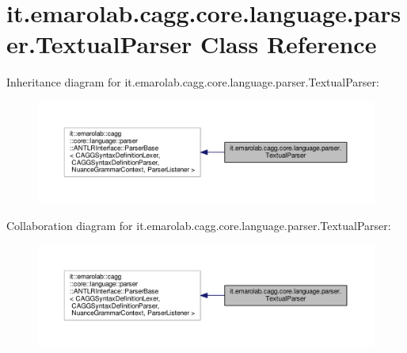 \hypertarget{classit_1_1emarolab_1_1cagg_1_1core_1_1language_1_1parser_1_1TextualParser}{\section{it.\-emarolab.\-cagg.\-core.\-language.\-parser.\-Textual\-Parser Class Reference}
\label{classit_1_1emarolab_1_1cagg_1_1core_1_1language_1_1parser_1_1TextualParser}
}


Inheritance diagram for it.\-emarolab.\-cagg.\-core.\-language.\-parser.\-Textual\-Parser\-:\nopagebreak
\begin{figure}[H]
\begin{center}
\leavevmode
\includegraphics[width=350pt]{classit_1_1emarolab_1_1cagg_1_1core_1_1language_1_1parser_1_1TextualParser__inherit__graph}
\end{center}
\end{figure}


Collaboration diagram for it.\-emarolab.\-cagg.\-core.\-language.\-parser.\-Textual\-Parser\-:\nopagebreak
\begin{figure}[H]
\begin{center}
\leavevmode
\includegraphics[width=350pt]{classit_1_1emarolab_1_1cagg_1_1core_1_1language_1_1parser_1_1TextualParser__coll__graph}
\end{center}
\end{figure}
